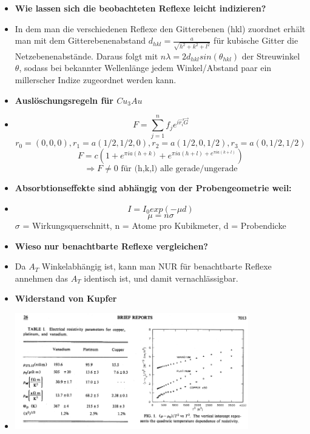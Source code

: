 \begin{itemize}
    \item \textbf{Wie lassen sich die beobachteten Reflexe leicht indizieren?}
    \item {In dem man die verschiedenen Reflexe den Gitterebenen (hkl) zuordnet erhält man mit dem
            Gitterebenenabstand $d_{hkl}=\frac{a}{\sqrt{h^2+k^2+l^2}}$ für kubische Gitter die Netzebenenabstände.
            Daraus folgt mit $n\lambda = 2d_{hkl}sin(\theta_{hkl})$ der Streuwinkel $\theta$, sodass bei 
            bekannter Wellenlänge jedem Winkel/Abstand paar ein millerscher Indize zugeordnet werden kann.}
    \item \textbf{Auslöschungsregeln für $Cu_3Au$}
    \item
                $$F = \sum_{j=1}^n f_j e^{i \vec{r_i} \vec{G}}$$ %
                $$r_0 = (0,0,0), r_1=a(1/2,1/2,0), r_2=a(1/2,0,1/2), r_3=a(0,1/2,1/2)$$%
                $$F = c(1+e^{\pi i a (h+k)}+e^{\pi i a (h+l)+e^{\pi i a (k+l)}})$$%
                $$\Rightarrow F \neq \text{0 für (h,k,l) alle gerade/ungerade} $$  
    \item \textbf{Absorbtionseffekte sind abhängig von der Probengeometrie weil:}
    \item $$I = I_0 exp(-\mu d)$$
          $$\mu = n \sigma$$
          $\sigma$ = Wirkungsquerschnitt, n = Atome pro Kubikmeter, d = Probendicke
    \item \textbf{Wieso nur benachtbarte Reflexe vergleichen?}
    \item Da $A_T$ Winkelabhängig ist, kann man NUR für benachtbarte Reflexe annehmen das $A_T$
          identisch ist, und damit vernachlässigbar.
    \item \textbf{Widerstand von Kupfer}
    \item \includegraphics[width=0.8\textwidth]{copperkek.PNG}

\end{itemize}

